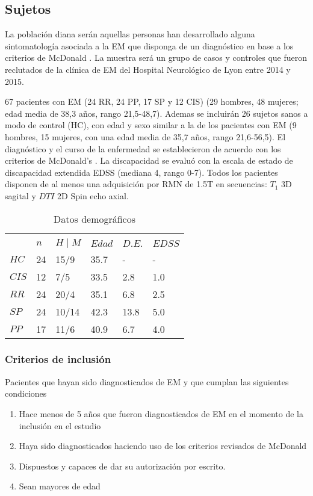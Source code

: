 \documentclass[fleqn,10pt]{UICArticle} %
\begin{document}
\subsection{Sujetos}
La población diana serán aquellas personas han desarrollado alguna sintomatología asociada a la EM que disponga de un diagnóstico en base a los criterios de McDonald \cite{Polman2011}. La muestra será un grupo de casos y controles que fueron reclutados de la clínica de EM del Hospital Neurológico de Lyon entre 2014 y 2015.

67 pacientes con EM (24 RR, 24 PP, 17 SP y 12 CIS) (29 hombres, 48 mujeres; edad media de 38,3 años, rango 21,5-48,7). Ademas se incluirán 26 sujetos sanos a modo de control (HC), con edad y sexo similar a la de los pacientes con EM (9 hombres, 15 mujeres, con una edad media de 35,7 años, rango 21,6-56,5). El diagnóstico y el curso de la enfermedad se establecieron de acuerdo con los criterios de McDonald's \cite{Polman2011}. La discapacidad se evaluó con la escala de estado de discapacidad extendida EDSS (mediana 4, rango 0-7). Todos los pacientes disponen de al menos una adquisición por RMN de 1.5T en secuencias: $T_1$ 3D sagital y $DTI$ 2D Spin echo axial.

\begin{table}[hbt]
\caption{Datos demográficos}
\centering
\begin{tabular}{llllll}
\toprule
\multicolumn{6}{l}{} \\
     & $n$   & $H \mid M$    & $Edad$  & $D.E.$  & $EDSS$  \\
$HC$   & 24  & 15/9   & 35.7  & -     & -     \\
$CIS$  & 12  & 7/5    & 33.5  & 2.8   & 1.0   \\
$RR$   & 24  & 20/4   & 35.1  & 6.8   & 2.5   \\
$SP$   & 24  & 10/14  & 42.3  & 13.8  & 5.0   \\
$PP$   & 17  & 11/6   & 40.9  & 6.7   & 4.0   \\
\bottomrule
\end{tabular}
\label{tab:demographics}
\end{table}

\subsubsection{Criterios de inclusión}
Pacientes que hayan sido diagnosticados de EM y que cumplan las siguientes condiciones
\begin{enumerate}[noitemsep]
\item Hace menos de 5 años que fueron diagnosticados de EM en el momento de la inclusión en el estudio
\item Haya sido diagnosticados haciendo uso de los criterios revisados de McDonald \cite{Polman20112}
\item Dispuestos y capaces de dar su autorización por escrito.
\item Sean mayores de edad
\end{enumerate}
\end{document}
